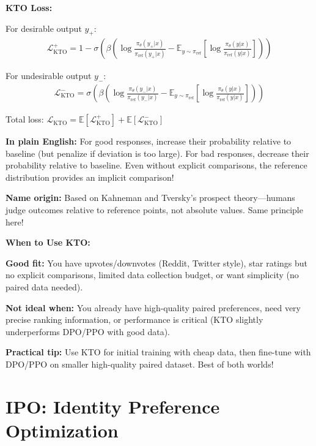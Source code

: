 \begin{chapterenv}
\begin{infobox}
\textbf{KTO Loss:}

For desirable output $y_+$:
\begin{align*}
\mathcal{L}_{\text{KTO}}^+ = 1 - \sigma\left( \beta \left( \log \frac{\pi_\theta(y_+ | x)}{\pi_{\text{ref}}(y_+ | x)} - \mathbb{E}_{y \sim \pi_{\text{ref}}} \left[\log \frac{\pi_\theta(y | x)}{\pi_{\text{ref}}(y | x)}\right] \right) \right)
\end{align*}

For undesirable output $y_-$:
\begin{align*}
\mathcal{L}_{\text{KTO}}^- = \sigma\left( \beta \left( \log \frac{\pi_\theta(y_- | x)}{\pi_{\text{ref}}(y_- | x)} - \mathbb{E}_{y \sim \pi_{\text{ref}}} \left[\log \frac{\pi_\theta(y | x)}{\pi_{\text{ref}}(y | x)}\right] \right) \right)
\end{align*}

Total loss: $\mathcal{L}_{\text{KTO}} = \mathbb{E}[\mathcal{L}_{\text{KTO}}^+] + \mathbb{E}[\mathcal{L}_{\text{KTO}}^-]$

\textbf{In plain English:} For good responses, increase their probability relative to baseline (but penalize if deviation is too large). For bad responses, decrease their probability relative to baseline. Even without explicit comparisons, the reference distribution provides an implicit comparison!

\textbf{Name origin:} Based on Kahneman and Tversky's prospect theory---humans judge outcomes relative to reference points, not absolute values. Same principle here!
\end{infobox}

\begin{tipbox}
\textbf{When to Use KTO:}

\textbf{Good fit:} You have upvotes/downvotes (Reddit, Twitter style), star ratings but no explicit comparisons, limited data collection budget, or want simplicity (no paired data needed).

\textbf{Not ideal when:} You already have high-quality paired preferences, need very precise ranking information, or performance is critical (KTO slightly underperforms DPO/PPO with good data).

\textbf{Practical tip:} Use KTO for initial training with cheap data, then fine-tune with DPO/PPO on smaller high-quality paired dataset. Best of both worlds!
\end{tipbox}

\section{IPO: Identity Preference Optimization}


\end{chapterenv}

